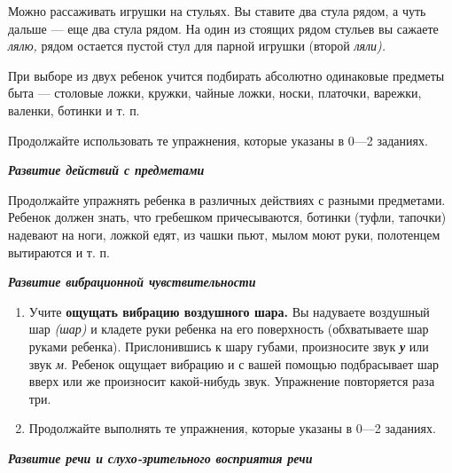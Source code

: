 \documentclass{book}
\renewcommand{\emph}[1]{\textit{#1}}
\begin{document}
Можно рассаживать игрушки на стульях. Вы ставите два стула рядом, а чуть
дальше --- еще два стула рядом. На один из стоящих рядом стульев вы
сажаете \emph{лялю,} рядом остается пустой стул для парной игрушки
(второй \emph{ляли).}

При выборе из двух ребенок учится подбирать абсолютно одинаковые
предметы быта --- столовые ложки, кружки, чайные ложки, носки, платочки,
варежки, валенки, ботинки и т. п.

Продолжайте использовать те упражнения, которые указаны в 0---2
заданиях.

\emph{\textbf{Развитие действий с предметами}}

Продолжайте упражнять ребенка в различных действиях с разными
предметами. Ребенок должен знать, что гребешком причесываются, ботинки
(туфли, тапочки) надевают на ноги, ложкой едят, из чашки пьют, мылом
моют руки, полотенцем вытираются и т. п.

\emph{\textbf{Развитие вибрационной чувствительности}}


\begin{enumerate}
\def\labelenumi{\arabic{enumi}.}
\item
  
  Учите \textbf{ощущать вибрацию воздушного шара.} Вы надуваете
  воздушный шар \emph{(шар)} и кладете руки ребенка на его поверхность
  (обхватываете шар руками ребенка). Прислонившись к шару губами,
  произносите звук \emph{\textbf{у}} или звук \emph{м.} Ребенок ощущает
  вибрацию и с вашей помощью подбрасывает шар вверх или же произносит
  какой-нибудь звук. Упражнение повторяется раза три.
  
\item
  
  Продолжайте выполнять те упражнения, которые указаны в 0---2 заданиях.
  
\end{enumerate}


\emph{\textbf{Развитие речи и слухо-зрительного восприятия речи}}
\end{document}
